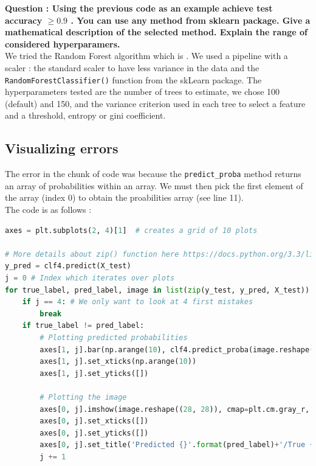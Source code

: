 \textbf{Question : Using the previous code as an example achieve test accuracy  $\geq0.9$ . You can use any method from sklearn package. Give a mathematical description of the selected method. Explain the range of considered hyperparamers.}\\
We tried the Random Forest algorithm which is . We used a pipeline with a scaler : the standard scaler to have less variance in the data and the \verb|RandomForestClassifier()| function from the skLearn package. The hyperparameters tested are the number of trees to estimate, we chose 100 (default) and 150,  and the variance criterion used in each tree to select a feature and a threshold, entropy or gini coefficient.


\subsection{Visualizing errors}
The error in the chunk of code was because the \verb|predict_proba| method returns an array of probabilities within an array. We must then pick the first element of the array (index 0) to obtain the proabilities array (see line 11).\\

The code is as follows :
 
\begin{lstlisting}[language=Python]
axes = plt.subplots(2, 4)[1]  # creates a grid of 10 plots

# More details about zip() function here https://docs.python.org/3.3/library/functions.html#zip
y_pred = clf4.predict(X_test)
j = 0 # Index which iterates over plots
for true_label, pred_label, image in list(zip(y_test, y_pred, X_test)):
    if j == 4: # We only want to look at 4 first mistakes
        break
    if true_label != pred_label:
        # Plotting predicted probabilities
        axes[1, j].bar(np.arange(10), clf4.predict_proba(image.reshape(1, -1))[0]) 
        axes[1, j].set_xticks(np.arange(10))
        axes[1, j].set_yticks([])
        
        # Plotting the image
        axes[0, j].imshow(image.reshape((28, 28)), cmap=plt.cm.gray_r, interpolation='nearest')
        axes[0, j].set_xticks([])
        axes[0, j].set_yticks([])
        axes[0, j].set_title('Predicted {}'.format(pred_label)+'/True {}'.format(true_label),fontsize=8)
        j += 1
\end{lstlisting}

